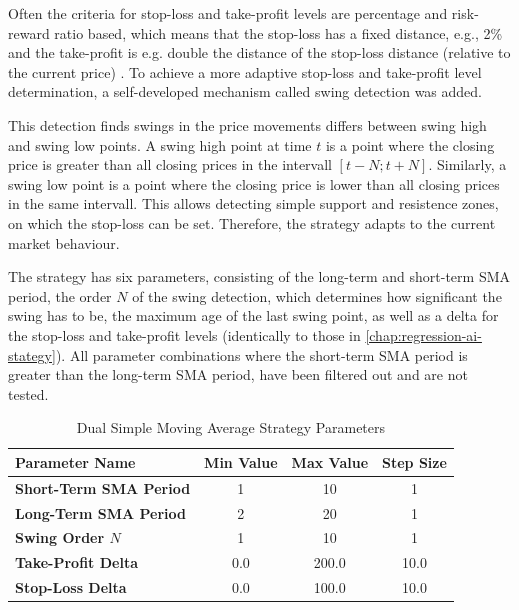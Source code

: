 Often the criteria for stop-loss and take-profit levels are percentage and risk-reward ratio based, which means that the stop-loss has a fixed distance, e.g., 2\% and the take-profit is e.g. double the distance of the stop-loss distance (relative to the current price) \cite{sma-sl-tp}.
To achieve a more adaptive stop-loss and take-profit level determination, a self-developed mechanism called swing detection was added.

This detection finds swings in the price movements differs between swing high and swing low points.
A swing high point at time $t$ is a point where the closing price is greater than all closing prices in the intervall $[t-N; t+N]$.
Similarly, a swing low point is a point where the closing price is lower than all closing prices in the same intervall.
This allows detecting simple support and resistence zones, on which the stop-loss can be set.
Therefore, the strategy adapts to the current market behaviour.



The strategy has six parameters, consisting of the long-term and short-term SMA period, the order $N$ of the swing detection, which determines how significant the swing has to be, the maximum age of the last swing point, as well as a delta for the stop-loss and take-profit levels (identically to those in \autoref{chap:regression-ai-stategy}).
All parameter combinations where the short-term SMA period is greater than the long-term SMA period, have been filtered out and are not tested.

\begin{table}[H]
    \centering
    \begin{tabular}{L{4cm}ccc}
        \toprule
        Parameter Name & Min Value & Max Value & Step Size
        \\
        \midrule
        \textbf{Short-Term SMA Period} & 1   & 10    & 1    \\
        \textbf{Long-Term SMA Period}  & 2   & 20    & 1    \\
        \textbf{Swing Order $N$}       & 1   & 10    & 1    \\
        \textbf{Take-Profit Delta}     & 0.0 & 200.0 & 10.0 \\
        \textbf{Stop-Loss Delta}       & 0.0 & 100.0 & 10.0 \\
        \bottomrule
    \end{tabular}
    \caption{Dual Simple Moving Average Strategy Parameters}
    \label{tbl:sma-strategy-parameters}
\end{table}

